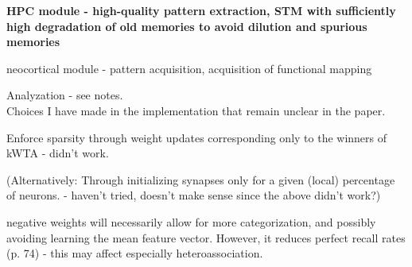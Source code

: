 \textbf{HPC module - high-quality pattern extraction, STM with sufficiently high degradation of old memories to avoid dilution and spurious memories}

neocortical module - pattern acquisition, acquisition of functional mapping

Analyzation - see notes.
\\

Choices I have made in the implementation that remain unclear in the paper.

Enforce sparsity through weight updates corresponding only to the winners of kWTA - didn't work.

(Alternatively: Through initializing synapses only for a given (local) percentage of neurons. - haven't tried, doesn't make sense since the above didn't work?)

negative weights will necessarily allow for more categorization, and possibly avoiding learning the mean feature vector. However, it reduces perfect recall rates (p. 74) - this may affect especially heteroassociation.